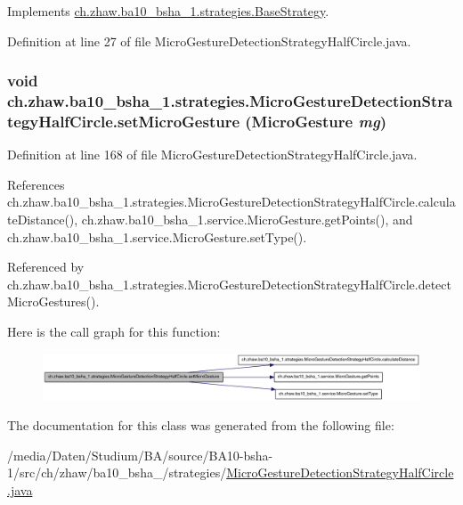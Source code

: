 Implements \hyperlink{classch_1_1zhaw_1_1ba10__bsha__1_1_1strategies_1_1BaseStrategy_a0496e8fd0099a5f0f7765322d7e752a9}{ch.zhaw.ba10\_\-bsha\_\-1.strategies.BaseStrategy}.

Definition at line 27 of file MicroGestureDetectionStrategyHalfCircle.java.\hypertarget{classch_1_1zhaw_1_1ba10__bsha__1_1_1strategies_1_1MicroGestureDetectionStrategyHalfCircle_aa8cae44f2d4c56a05d29eb5a1c53abdd}{
\subsubsection[{setMicroGesture}]{\setlength{\rightskip}{0pt plus 5cm}void ch.zhaw.ba10\_\-bsha\_\-1.strategies.MicroGestureDetectionStrategyHalfCircle.setMicroGesture ({\bf MicroGesture} {\em mg})}}
\label{classch_1_1zhaw_1_1ba10__bsha__1_1_1strategies_1_1MicroGestureDetectionStrategyHalfCircle_aa8cae44f2d4c56a05d29eb5a1c53abdd}


Definition at line 168 of file MicroGestureDetectionStrategyHalfCircle.java.

References ch.zhaw.ba10\_\-bsha\_\-1.strategies.MicroGestureDetectionStrategyHalfCircle.calculateDistance(), ch.zhaw.ba10\_\-bsha\_\-1.service.MicroGesture.getPoints(), and ch.zhaw.ba10\_\-bsha\_\-1.service.MicroGesture.setType().

Referenced by ch.zhaw.ba10\_\-bsha\_\-1.strategies.MicroGestureDetectionStrategyHalfCircle.detectMicroGestures().

Here is the call graph for this function:\nopagebreak
\begin{figure}[H]
\begin{center}
\leavevmode
\includegraphics[width=420pt]{classch_1_1zhaw_1_1ba10__bsha__1_1_1strategies_1_1MicroGestureDetectionStrategyHalfCircle_aa8cae44f2d4c56a05d29eb5a1c53abdd_cgraph}
\end{center}
\end{figure}


The documentation for this class was generated from the following file:\begin{DoxyCompactItemize}
\item 
/media/Daten/Studium/BA/source/BA10-\/bsha-\/1/src/ch/zhaw/ba10\_\-bsha\_/strategies/\hyperlink{MicroGestureDetectionStrategyHalfCircle_8java}{MicroGestureDetectionStrategyHalfCircle.java}\end{DoxyCompactItemize}
